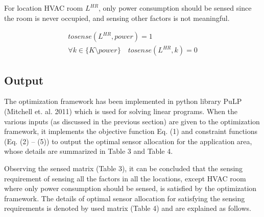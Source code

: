 \documentclass[]{interact}
\theoremstyle{plain}%
\theoremstyle{definition}
\theoremstyle{remark}
\begin{document}
For location HVAC room $L^{HR}$, only power consumption should be sensed since the room is never occupied, and sensing other factors is not meaningful.

\begin{equation}
  \begin{split}
    tosense(L^{HR}, power) = 1 \\
    \forall k \in \{K \setminus power \} \quad tosense(L^{HR},k) = 0
  \end{split}
\end{equation}


\subsection{Output}

The optimization framework has been implemented in python library PuLP (Mitchell et. al. 2011) which is used for solving linear programs. When the various inputs (as discussed in the previous section) are given to the optimization framework, it implements the objective function Eq. (1) and constraint functions (Eq. (2) – (5)) to output the optimal sensor allocation for the application area, whose details are summarized in Table 3 and Table 4.

Observing the sensed matrix (Table 3), it can be concluded that the sensing requirement of sensing all the factors in all the locations, except HVAC room where only power consumption should be sensed, is satisfied by the optimization framework. The details of optimal sensor allocation for satisfying the sensing requirements is denoted by used matrix (Table 4) and are explained as follows. 
\end{document}
